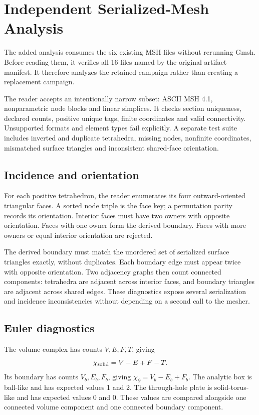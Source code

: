 \documentclass[twoside,leqno,twocolumn]{article}
\begin{document}
\section{Independent Serialized-Mesh Analysis}
The added analysis consumes the six existing MSH files without rerunning Gmsh. Before reading them, it verifies all 16 files named by the original artifact manifest. It therefore analyzes the retained campaign rather than creating a replacement campaign.

The reader accepts an intentionally narrow subset: ASCII MSH 4.1, nonparametric node blocks and linear simplices. It checks section uniqueness, declared counts, positive unique tags, finite coordinates and valid connectivity. Unsupported formats and element types fail explicitly. A separate test suite includes inverted and duplicate tetrahedra, missing nodes, nonfinite coordinates, mismatched surface triangles and inconsistent shared-face orientation.

\subsection{Incidence and orientation}
For each positive tetrahedron, the reader enumerates its four outward-oriented triangular faces. A sorted node triple is the face key; a permutation parity records its orientation. Interior faces must have two owners with opposite orientation. Faces with one owner form the derived boundary. Faces with more owners or equal interior orientation are rejected.

The derived boundary must match the unordered set of serialized surface triangles exactly, without duplicates. Each boundary edge must appear twice with opposite orientation. Two adjacency graphs then count connected components: tetrahedra are adjacent across interior faces, and boundary triangles are adjacent across shared edges. These diagnostics expose several serialization and incidence inconsistencies without depending on a second call to the mesher.

\subsection{Euler diagnostics}
The volume complex has counts $V,E,F,T$, giving
\begin{equation}
 \chi_{\rm solid}=V-E+F-T.
\end{equation}
Its boundary has counts $V_b,E_b,F_b$, giving $\chi_{\partial}=V_b-E_b+F_b$. The analytic box is ball-like and has expected values 1 and 2. The through-hole plate is solid-torus-like and has expected values 0 and 0. These values are compared alongside one connected volume component and one connected boundary component.
\end{document}
